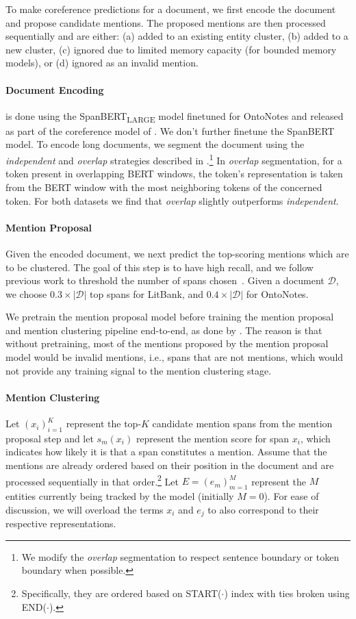 \documentclass[11pt,a4paper]{article}
\begin{document}
To make coreference predictions for a document, we first encode the document and propose candidate mentions.
The proposed mentions are then processed sequentially and are either: (a) added to an existing entity cluster, (b) added to a new cluster, (c) ignored due to limited memory capacity (for bounded memory models), or (d) ignored as an invalid mention.


\paragraph{Document Encoding}
is done using the SpanBERT\textsubscript{LARGE} model finetuned for OntoNotes and released as part of the coreference model of \citet{joshi2020span}.
We don't further finetune the SpanBERT model.
To encode long documents, we segment the document using the \emph{independent} and \emph{overlap} strategies described in \citet{joshi-etal-2019-bert}.\footnote{We modify the \emph{overlap} segmentation to respect sentence boundary or token boundary when possible.}
In \emph{overlap} segmentation, for a token present in overlapping BERT windows, the token's representation is taken from the BERT window with the most neighboring tokens of the concerned token.
For both datasets we find that \emph{overlap} slightly outperforms \emph{independent}.


\paragraph{Mention Proposal}
\label{sec:ment_proposal}
Given the encoded document, we next predict the top-scoring mentions which are to be clustered.
The goal of this step is to have high recall, and we follow previous work to threshold the number of spans chosen~\citep{lee-etal-2017-end}.
Given a document $\mathcal{D}$, we choose $0.3 \times |\mathcal{D}|$ top spans for LitBank, and  $0.4 \times |\mathcal{D}|$ for OntoNotes.

We pretrain the mention proposal model before training the mention proposal and mention clustering pipeline end-to-end, as done by \citet{wu2019coreference}.
The reason is that without pretraining, most of the mentions proposed by the mention proposal model would be invalid mentions, i.e., spans that are not mentions, which would not provide any training signal to the mention clustering stage.


\paragraph{Mention Clustering}
Let $(x_i)_{i=1}^K$ represent the top-$K$ candidate mention spans from the mention proposal step and let $s_m(x_i)$ represent the mention score for span $x_i$, which indicates how likely it is that a span constitutes a mention.
Assume that the mentions are already ordered based on their position in the document and are processed sequentially in that order.\footnote{Specifically, they are ordered based on START($\cdot$) index with ties broken using END($\cdot$).}
Let $E = (e_m)_{m=1}^M$ represent the $M$ entities currently being tracked by the model (initially $M = 0$).
For ease of discussion, we will overload the terms $x_i$ and $e_j$ to also correspond to their respective representations.
\end{document}
